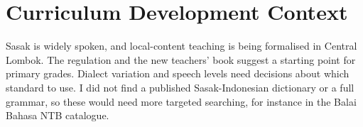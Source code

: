 \documentclass[12pt]{article}
\begin{document}
\section{Curriculum Development Context}
Sasak is widely spoken, and local-content teaching is being formalised in Central Lombok. The regulation and the new teachers' book suggest a starting point for primary grades. Dialect variation and speech levels need decisions about which standard to use. I did not find a published Sasak-Indonesian dictionary or a full grammar, so these would need more targeted searching, for instance in the Balai Bahasa NTB catalogue.
\end{document}
